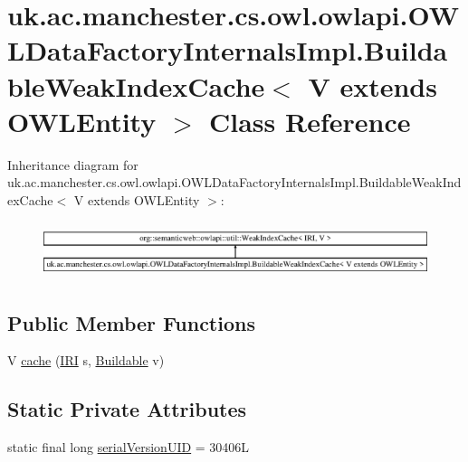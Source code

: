 \hypertarget{classuk_1_1ac_1_1manchester_1_1cs_1_1owl_1_1owlapi_1_1_o_w_l_data_factory_internals_impl_1_1_bui2da4e2836e65187c58a7bd99e8ddeb30}{\section{uk.\-ac.\-manchester.\-cs.\-owl.\-owlapi.\-O\-W\-L\-Data\-Factory\-Internals\-Impl.\-Buildable\-Weak\-Index\-Cache$<$ V extends O\-W\-L\-Entity $>$ Class Reference}
\label{classuk_1_1ac_1_1manchester_1_1cs_1_1owl_1_1owlapi_1_1_o_w_l_data_factory_internals_impl_1_1_bui2da4e2836e65187c58a7bd99e8ddeb30}
}
Inheritance diagram for uk.\-ac.\-manchester.\-cs.\-owl.\-owlapi.\-O\-W\-L\-Data\-Factory\-Internals\-Impl.\-Buildable\-Weak\-Index\-Cache$<$ V extends O\-W\-L\-Entity $>$\-:\begin{figure}[H]
\begin{center}
\leavevmode
\includegraphics[height=1.669151cm]{classuk_1_1ac_1_1manchester_1_1cs_1_1owl_1_1owlapi_1_1_o_w_l_data_factory_internals_impl_1_1_bui2da4e2836e65187c58a7bd99e8ddeb30}
\end{center}
\end{figure}
\subsection*{Public Member Functions}
\begin{DoxyCompactItemize}
\item 
V \hyperlink{classuk_1_1ac_1_1manchester_1_1cs_1_1owl_1_1owlapi_1_1_o_w_l_data_factory_internals_impl_1_1_bui2da4e2836e65187c58a7bd99e8ddeb30_aa06b40b7316e557c353ad6b4287be744}{cache} (\hyperlink{classorg_1_1semanticweb_1_1owlapi_1_1model_1_1_i_r_i}{I\-R\-I} s, \hyperlink{enumuk_1_1ac_1_1manchester_1_1cs_1_1owl_1_1owlapi_1_1_o_w_l_data_factory_internals_impl_1_1_buildable}{Buildable} v)
\end{DoxyCompactItemize}
\subsection*{Static Private Attributes}
\begin{DoxyCompactItemize}
\item 
static final long \hyperlink{classuk_1_1ac_1_1manchester_1_1cs_1_1owl_1_1owlapi_1_1_o_w_l_data_factory_internals_impl_1_1_bui2da4e2836e65187c58a7bd99e8ddeb30_a33c65f5c551e6c8a08407bb78404e62f}{serial\-Version\-U\-I\-D} = 30406\-L
\end{DoxyCompactItemize}


